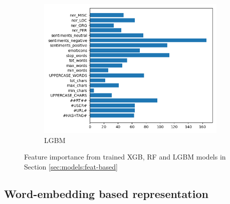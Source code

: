 \begin{figure}[htbp]
\begin{subfigure}[b]{0.48\textwidth}
         \includegraphics[width=\textwidth]{assets/img/lgb_imp.png}
         \caption{\ac{LGBM}}
         \label{fig:results:feat-imp::lgbm}
     \end{subfigure}
        \caption[Feature importance from trained \texorpdfstring{XGB}{XGB}, \texorpdfstring{RF}{RF} and \texorpdfstring{LGBM}{LGBM} models in Section \ref{sec:models:feat-based}]{Feature importance from trained \ac{XGB}, \ac{RF} and \ac{LGBM} models in Section \ref{sec:models:feat-based}}
        \label{fig:results:feat-imp}
\end{figure}

\newpage

\subsection{Word-embedding based representation}
\label{sec:results:word-emb}

